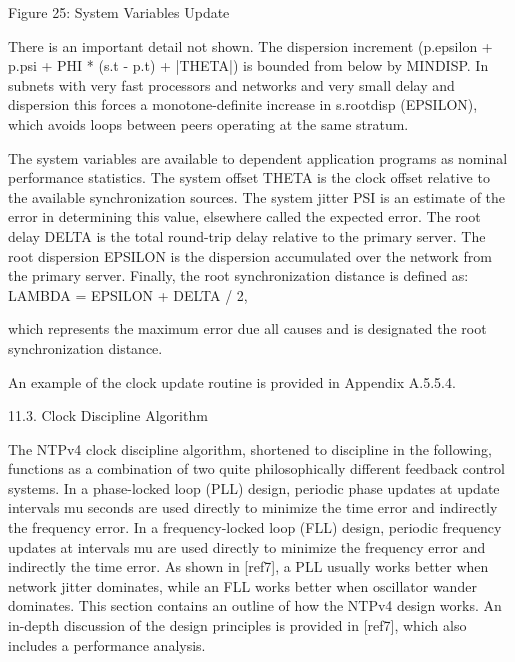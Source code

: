                     Figure 25: System Variables Update

   There is an important detail not shown.  The dispersion increment
   (p.epsilon + p.psi + PHI * (s.t - p.t) + |THETA|) is bounded from
   below by MINDISP.  In subnets with very fast processors and networks
   and very small delay and dispersion this forces a monotone-definite
   increase in s.rootdisp (EPSILON), which avoids loops between peers
   operating at the same stratum.

   The system variables are available to dependent application programs
   as nominal performance statistics.  The system offset THETA is the
   clock offset relative to the available synchronization sources.  The
   system jitter PSI is an estimate of the error in determining this
   value, elsewhere called the expected error.  The root delay DELTA is
   the total round-trip delay relative to the primary server.  The root
   dispersion EPSILON is the dispersion accumulated over the network
   from the primary server.  Finally, the root synchronization distance
   is defined as:
  LAMBDA = EPSILON + DELTA / 2,

   which represents the maximum error due all causes and is designated
   the root synchronization distance.

   An example of the clock update routine is provided in
   Appendix A.5.5.4.

11.3.  Clock Discipline Algorithm

   The NTPv4 clock discipline algorithm, shortened to discipline in the
   following, functions as a combination of two quite philosophically
   different feedback control systems.  In a phase-locked loop (PLL)
   design, periodic phase updates at update intervals mu seconds are
   used directly to minimize the time error and indirectly the frequency
   error.  In a frequency-locked loop (FLL) design, periodic frequency
   updates at intervals mu are used directly to minimize the frequency
   error and indirectly the time error.  As shown in [ref7], a PLL
   usually works better when network jitter dominates, while an FLL
   works better when oscillator wander dominates.  This section contains
   an outline of how the NTPv4 design works.  An in-depth discussion of
   the design principles is provided in [ref7], which also includes a
   performance analysis.

